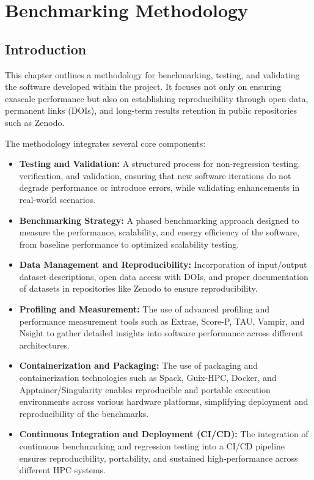 
\chapter{Benchmarking Methodology}
\label{chap:methodology}

\section{Introduction}
\label{sec:methodology-intro}

This chapter outlines a methodology for benchmarking, testing, and validating the software developed within the \exama project. 
It focuses not only on ensuring exascale performance but also on establishing reproducibility through open data, permanent links (DOIs), and long-term results retention in public repositories such as Zenodo. 

The methodology integrates several core components:
\begin{itemize}
    \item \textbf{Testing and Validation:} A structured process for non-regression testing, verification, and validation, ensuring that new software iterations do not degrade performance or introduce errors, while validating enhancements in real-world scenarios.
    \item \textbf{Benchmarking Strategy:} A phased benchmarking approach designed to measure the performance, scalability, and energy efficiency of the software, from baseline performance to optimized scalability testing.
    \item \textbf{Data Management and Reproducibility:} Incorporation of input/output dataset descriptions, open data access with DOIs, and proper documentation of datasets in repositories like Zenodo to ensure reproducibility.
    \item \textbf{Profiling and Measurement:} The use of advanced profiling and performance measurement tools such as Extrae, Score-P, TAU, Vampir, and Nsight to gather detailed insights into software performance across different architectures.
    \item \textbf{Containerization and Packaging:} The use of packaging and containerization technologies such as Spack, Guix-HPC, Docker, and Apptainer/Singularity enables reproducible and portable execution environments across various hardware platforms, simplifying deployment and reproducibility of the benchmarks.
    \item \textbf{Continuous Integration and Deployment (CI/CD):} The integration of continuous benchmarking and regression testing into a CI/CD pipeline ensures reproducibility, portability, and sustained high-performance across different HPC systems.
\end{itemize}


